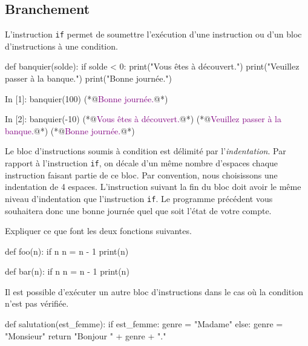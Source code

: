 \documentclass{magnoliaold}
\begin{document}
\subsection{Branchement}

L'instruction \verb_if_ permet de soumettre l'exécution d'une instruction ou d'un bloc d'instructions à une condition.

\begin{pythoncodeline}
def banquier(solde):
    if solde < 0:
        print("Vous êtes à découvert.")
        print("Veuillez passer à la banque.")
    print("Bonne journée.")
\end{pythoncodeline}
    
\begin{pythoncode}
In [1]: banquier(100)
(*@\textcolor{purple}{Bonne journée.}@*)

In [2]: banquier(-10)
(*@\textcolor{purple}{Vous êtes à découvert.}@*)
(*@\textcolor{purple}{Veuillez passer à la banque.}@*)
(*@\textcolor{purple}{Bonne journée.}@*)
\end{pythoncode}

\noindent Le bloc d'instructions soumis à condition est délimité par l'\emph{indentation}. Par rapport à l'instruction \verb_if_, on décale d'un même nombre d'espaces chaque instruction faisant partie de ce bloc. Par convention, nous choisissons une indentation de 4 espaces. L'instruction suivant la fin du bloc doit avoir le même niveau d'indentation que l'instruction \verb_if_. Le programme précédent vous souhaitera donc une bonne journée quel que soit l'état de votre compte.\\

\begin{exoUnique}
\exo Expliquer ce que font les deux fonctions suivantes.
\begin{pythoncodeline}
def foo(n):
    if n %
        n = n - 1
    print(n)

def bar(n):
    if n %
        n = n - 1
        print(n)
\end{pythoncodeline}
\end{exoUnique}
\bigskip

Il est possible d'exécuter un autre bloc d'instructions dans le cas où la condition n'est pas vérifiée.

\begin{pythoncodeline}
def salutation(est_femme):
    if est_femme:
        genre = "Madame"
    else:
        genre = "Monsieur"
    return "Bonjour " + genre + "."
\end{pythoncodeline}
\end{document}
